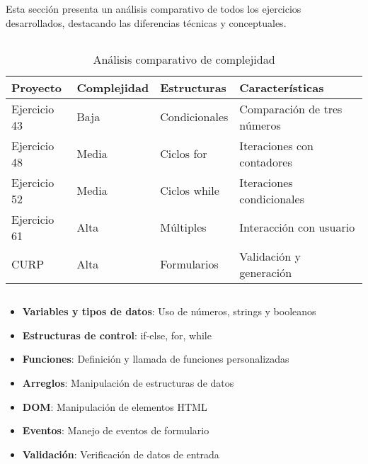 \documentclass[10pt,a4paper]{article}
\begin{document}
\pagebreak

\section{\color{colorIPN}{Análisis Comparativo de Proyectos}}
Esta sección presenta un análisis comparativo de todos los ejercicios desarrollados, destacando las diferencias técnicas y conceptuales.

\subsection{\color{colorESCOM}{Complejidad de los Algoritmos}}
\begin{table}[H]
	\centering
	\begin{tabular}{|p{3cm}|p{2cm}|p{3cm}|p{5cm}|}
		\hline
		\textbf{Proyecto} & \textbf{Complejidad} & \textbf{Estructuras} & \textbf{Características} \\ \hline
		Ejercicio 43 & Baja & Condicionales & Comparación de tres números \\ \hline
		Ejercicio 48 & Media & Ciclos for & Iteraciones con contadores \\ \hline
		Ejercicio 52 & Media & Ciclos while & Iteraciones condicionales \\ \hline
		Ejercicio 61 & Alta & Múltiples & Interacción con usuario \\ \hline
		CURP & Alta & Formularios & Validación y generación \\ \hline
	\end{tabular}
	\caption{Análisis comparativo de complejidad}
	\label{tab:complejidad}
\end{table}

\subsection{\color{colorESCOM}{Conceptos Programáticos Aplicados}}
\begin{itemize}
	\item \textbf{Variables y tipos de datos}: Uso de números, strings y booleanos
	\item \textbf{Estructuras de control}: if-else, for, while
	\item \textbf{Funciones}: Definición y llamada de funciones personalizadas
	\item \textbf{Arreglos}: Manipulación de estructuras de datos
	\item \textbf{DOM}: Manipulación de elementos HTML
	\item \textbf{Eventos}: Manejo de eventos de formulario
	\item \textbf{Validación}: Verificación de datos de entrada
\end{itemize}
\end{document}
